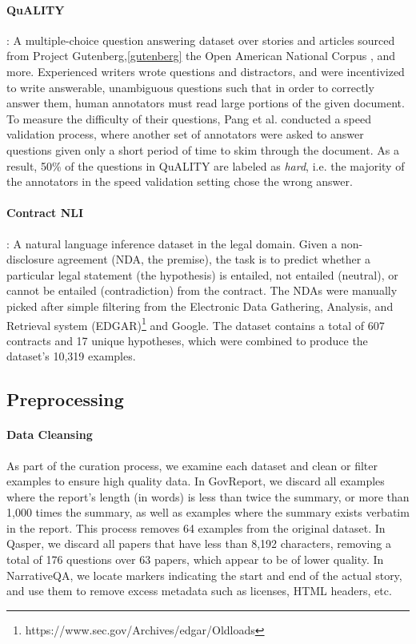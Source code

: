 \paragraph{QuALITY} \cite{pang2021quality}: A multiple-choice question answering dataset over stories and articles sourced from Project Gutenberg,\ref{gutenberg} the Open American National Corpus \cite{Fillmore1998AnAN, ide-suderman-2004-american}, and more. Experienced writers wrote questions and distractors, and were incentivized to write answerable, unambiguous questions such that in order to correctly answer them, human annotators must read large portions of the given document. To measure the difficulty of their questions, Pang et al. conducted a speed validation process, where another set of annotators were asked to answer questions given only a short period of time to skim through the document. As a result, 50\% of the questions in QuALITY are labeled as \textit{hard}, i.e. the majority of the annotators in the speed validation setting chose the wrong answer.

\paragraph{Contract NLI} \cite{koreeda2021contractnli}: A natural language inference dataset in the legal domain. Given a non-disclosure agreement (NDA, the premise), the task is to predict whether a particular legal statement (the hypothesis) is entailed, not entailed (neutral), or cannot be entailed (contradiction) from the contract. The NDAs were manually picked after simple filtering from the Electronic Data Gathering, Analysis, and Retrieval system (EDGAR)\footnote{https://www.sec.gov/Archives/edgar/Oldloads} and Google. The dataset contains a total of 607 contracts and 17 unique hypotheses, which were combined to produce the dataset's 10,319 examples.

\subsection{Preprocessing}

\paragraph{Data Cleansing} As part of the curation process, we examine each dataset and clean or filter examples to ensure high quality data. In GovReport, we discard all examples where the report's length (in words) is less than twice the summary, or more than 1,000 times the summary, as well as examples where the summary exists verbatim in the report. This process removes 64 examples from the original dataset. In Qasper, we discard all papers that have less than 8,192 characters, removing a total of 176 questions over 63 papers, which appear to be of lower quality. In NarrativeQA, we locate markers indicating the start and end of the actual story, and use them to remove excess metadata such as licenses, HTML headers, etc.


